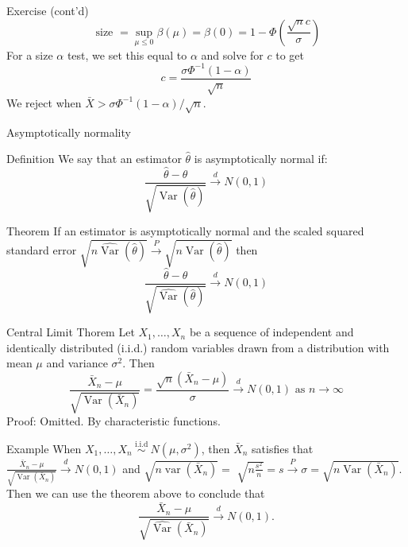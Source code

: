 \documentclass[
  ignorenonframetext,
]{beamer}
\begin{document}
\begin{frame}{Exercise (cont'd)}
\protect{}\label{exercise-contd-1}
\[
\text { size }=\sup _{\mu \leq 0} \beta(\mu)=\beta(0)=1-\Phi\left(\frac{\sqrt{n} c}{\sigma}\right)
\] For a size \(\alpha\) test, we set this equal to \(\alpha\) and solve
for \(c\) to get \[
c=\frac{\sigma \Phi^{-1}(1-\alpha)}{\sqrt{n}}
\] We reject when \(\bar{X}>\sigma \Phi^{-1}(1-\alpha) / \sqrt{n}\).
\end{frame}

\begin{frame}{Asymptotically normality}
\protect{}\label{asymptotically-normality}
\begin{block}{Definition}
\protect{}\label{definition}
We say that an estimator \(\hat{\theta}\) is asymptotically normal if:
\[
\frac{\hat{\theta}-\theta}{\sqrt{\operatorname{Var}(\hat{\theta})}} \stackrel{d}{\rightarrow} N(0,1)
\]
\end{block}

\begin{block}{Theorem}
\protect{}\label{theorem}
If an estimator is asymptotically normal and the scaled squared standard
error
\(\sqrt{n \widehat{\operatorname{Var}}(\hat{\theta})} \stackrel{P}{\rightarrow} \sqrt{n \operatorname{Var}(\hat{\theta})}\)
then \[
\frac{\hat{\theta}-\theta}{\sqrt{\widehat{\operatorname{Var}}(\hat{\theta})}} \stackrel{d}{\rightarrow} N(0,1)
\]
\end{block}
\end{frame}

\begin{frame}{Central Limit Thorem}
\protect{}\label{central-limit-thorem}
Let \(X_1, \ldots, X_n\) be a sequence of independent and identically
distributed (i.i.d.) random variables drawn from a distribution with
mean \(\mu\) and variance \(\sigma^2\). Then \[
\frac{\bar{X}_n-\mu}{\sqrt{\operatorname{Var}\left(\bar{X}_n\right)}}=\frac{\sqrt{n}\left(\bar{X}_n-\mu\right)}{\sigma} \stackrel{d}{\rightarrow} N(0,1) \text { as } n \rightarrow \infty
\] Proof: Omitted. By characteristic functions.
\end{frame}

\begin{frame}{Example}
\protect{}\label{example}
When
\(X_1, \ldots, X_n \stackrel{\text { i.i.d }}{\sim} N\left(\mu, \sigma^2\right)\),
then \(\bar{X}_n\) satisfies that
\(\frac{\bar{X}_n-\mu}{\sqrt{\operatorname{Var}\left(\bar{X}_n\right)}} \stackrel{d}{\rightarrow} N(0,1)\)
and \(\sqrt{n \operatorname{var}\left(\bar{X}_n\right)}=\)
\(\sqrt{n \frac{s^2}{n}}=s \stackrel{P}{\rightarrow} \sigma=\sqrt{n \operatorname{Var}\left(\bar{X}_n\right)}\).
Then we can use the theorem above to conclude that \[
\frac{\bar{X}_n-\mu}{\sqrt{\widehat{\operatorname{Var}}\left(\bar{X}_n\right)}} \stackrel{d}{\rightarrow} N(0,1).
\]
\end{frame}
\end{document}
